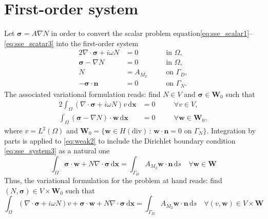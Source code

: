 \documentclass[11pt,a4paper]{article}
\begin{document}
\section*{First-order system}
Let $\boldsymbol{\sigma}=A\nabla N$ in order to convert the scalar problem equation\eqref{eq:sse_scalar1}--\eqref{eq:sse_scatar3} into the first-order system
\begin{alignat}{2}
\nabla\cdot\boldsymbol{\sigma}+i\omega N&=0  \quad && \text{in } \Omega,
\label{eq:sse_system1}\\
\boldsymbol{\sigma}-\nabla N&=0 \quad && \text{in } \Omega,\\
N&=A_{M_2} \quad && \text{on } \Gamma_D,
\label{eq:sse_system3}\\
-\boldsymbol{\sigma}\cdot\mathbf{n}&=0 \quad && \text{on } \Gamma_N.
\label{eq:sse_system4}
\end{alignat}
The associated variational formulation reads: find $N\in V$ and $\boldsymbol{\sigma}\in\mathbf{W}_0$ such that 
\begin{alignat}{2}
\int_\Omega\left(\nabla\cdot\boldsymbol{\sigma}+i\omega N\right)v\,\mathrm{d}\mathbf{x}&=0 \quad && \forall v\in V,
\label{eq:weak1}\\
\int_\Omega\left(\boldsymbol{\sigma}-\nabla N\right)\cdot\mathbf{w}\,\mathrm{d}\mathbf{x}&=0 \quad && \forall \mathbf{w}\in \mathbf{W}_0,
\label{eq:weak2}
\end{alignat}
where $v=L^2(\Omega)$ and $\mathbf{W}_0=\{\mathbf{w}\in H(\text{div})\,:\,\mathbf{w}\cdot\mathbf{n}=0 \text{ on }\Gamma_N\}$.
Integration by parts is applied to \eqref{eq:weak2} to include the Dirichlet boundary condition \eqref{eq:sse_system3} as a natural one
\begin{equation}
\int_\Omega\boldsymbol{\sigma}\cdot\mathbf{w}+N\nabla\cdot\boldsymbol{\sigma}\,\mathrm{d}\mathbf{x}=\int_{\Gamma_D} A_{M_2}\mathbf{w}\cdot\mathbf{n}\,\mathrm{d}s \quad \forall \mathbf{w}\in \mathbf{W}
\end{equation}
Thus, the variational formulation for the problem at hand reads: find $(N,\boldsymbol{\sigma})\in V\times\mathbf{W}_0$ such that
\begin{equation}
\int_\Omega\left(\nabla\cdot\boldsymbol{\sigma}+i\omega N\right)v+\boldsymbol{\sigma}\cdot\mathbf{w}+N\nabla\cdot\boldsymbol{\sigma}\,\mathrm{d}\mathbf{x}=\int_{\Gamma_D} A_{M_2}\mathbf{w}\cdot\mathbf{n}\,\mathrm{d}s \quad \forall (v,\mathbf{w})\in V\times\mathbf{W}
\end{equation}
\end{document}
